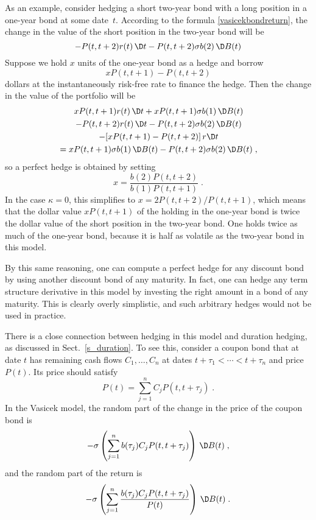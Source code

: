 As an example, consider hedging a short two-year bond with a long position in a one-year bond at some date~$t$.  
According to the formula \eqref{vasicekbondreturn}, the change in the value of the short position in the two-year bond  will be
$$-P(t,t+2)r(t)\,\D t-P(t,t+2)\sigma b(2)\,\D B(t)$$
Suppose we hold $x$ units of the one-year bond as a hedge and borrow 
$$xP(t,t+1)-P(t,t+2)$$
dollars at the instantaneously risk-free rate to finance the hedge.  Then the change in the value of the portfolio will be
\begin{multline*}
xP(t,t+1)r(t)\,\D t+xP(t,t+1)\sigma b(1)\,\D B(t) \\- P(t,t+2)r(t)\,\D t-P(t,t+2)\sigma b(2)\,\D B(t) \\- [xP(t,t+1)-P(t,t+2)]\,r\D t \\= xP(t,t+1)\sigma b(1) \,\D B(t) -P(t,t+2)\sigma b(2)\,\D B(t)\;,
\end{multline*}
so a perfect hedge is obtained by setting
$$x = \frac{b(2)P(t,t+2)}{b(1)P(t,t+1)}\; .$$
In the case $\kappa=0$, this simplifies to $x=2P(t,t+2)/P(t,t+1)$, which means that the dollar value $xP(t,t+1)$ of the holding in the one-year bond is 
  twice the dollar value of the short position in the two-year bond.  One holds twice as much of the one-year bond, because it is half as volatile as the two-year bond in this model.

By this same reasoning, one can compute a perfect hedge for any discount bond by using another discount bond of any maturity.  In fact, one can hedge any term structure derivative in this model by investing the right amount in a bond of any maturity.  This is clearly overly simplistic, and such arbitrary hedges would not be used in practice.

There is a close connection between hedging in this model and duration hedging, as discussed in Sect.~\ref{s_duration}.  To see this, consider a coupon
bond that at date $t$ has remaining cash flows $C_1, \ldots, C_n$ at dates $t+\tau_1 < \cdots < t+\tau_n$ and price $P(t)$.  Its price should satisfy
$$
P(t) = \sum_{j=1}^n C_jP(t,t+\tau_j)\;.
$$
In the Vasicek model, the random part of the change in the price of the coupon bond is
$$-\sigma\left(\sum_{j=1}^n b(\tau_j)C_jP(t,t+\tau_j)\right)\,\D B(t) \; ,$$
and the random part of the return is
\begin{equation}\label{vasicekcouponreturn}
-\sigma\left(\sum_{j=1}^n \frac{b(\tau_j)C_jP(t,t+\tau_j)}{P(t)}\right)\,\D B(t)\;.
\end{equation}

